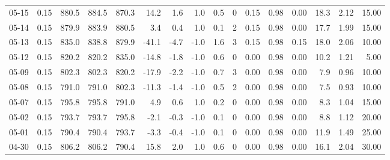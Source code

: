 \begin{threeparttable}
{\begin{tabular}{lrrrrrrrrrrrrrrr}
  05-15 &     0.15 & 880.5 & 884.5 & 870.3 &       14.2 &            1.6 &                      1.0 &                 0.5 &              0 &       0.15 &      0.98 &           0.00 &             18.3 &            2.12 &                  15.00 \\
  05-14 &     0.15 & 879.9 & 883.9 & 880.5 &        3.4 &            0.4 &                      1.0 &                 0.1 &              2 &       0.15 &      0.98 &           0.00 &             17.7 &            1.99 &                  15.00 \\
  05-13 &     0.15 & 835.0 & 838.8 & 879.9 &      -41.1 &           -4.7 &                     -1.0 &                 1.6 &              3 &       0.15 &      0.98 &           0.15 &             18.0 &            2.06 &                  10.00 \\
  05-12 &     0.15 & 820.2 & 820.2 & 835.0 &      -14.8 &           -1.8 &                     -1.0 &                 0.6 &              0 &       0.00 &      0.98 &           0.00 &             10.2 &            1.21 &                   5.00 \\
  05-09 &     0.15 & 802.3 & 802.3 & 820.2 &      -17.9 &           -2.2 &                     -1.0 &                 0.7 &              3 &       0.00 &      0.98 &           0.00 &              7.9 &            0.96 &                  10.00 \\
  05-08 &     0.15 & 791.0 & 791.0 & 802.3 &      -11.3 &           -1.4 &                     -1.0 &                 0.5 &              2 &       0.00 &      0.98 &           0.00 &              7.5 &            0.93 &                  10.00 \\
  05-07 &     0.15 & 795.8 & 795.8 & 791.0 &        4.9 &            0.6 &                      1.0 &                 0.2 &              0 &       0.00 &      0.98 &           0.00 &              8.3 &            1.04 &                  15.00 \\
  05-02 &     0.15 & 793.7 & 793.7 & 795.8 &       -2.1 &           -0.3 &                     -1.0 &                 0.1 &              0 &       0.00 &      0.98 &           0.00 &              8.8 &            1.12 &                  20.00 \\
  05-01 &     0.15 & 790.4 & 790.4 & 793.7 &       -3.3 &           -0.4 &                     -1.0 &                 0.1 &              0 &       0.00 &      0.98 &           0.00 &             11.9 &            1.49 &                  25.00 \\
  04-30 &     0.15 & 806.2 & 806.2 & 790.4 &       15.8 &            2.0 &                      1.0 &                 0.6 &              0 &       0.00 &      0.98 &           0.00 &             16.1 &            2.04 &                  30.00 \\

\end{tabular}}
\end{threeparttable}
